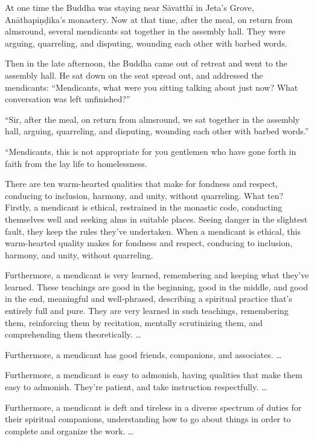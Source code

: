 \documentclass[12pt,openany]{book}%
\begin{document}
At one time the Buddha was staying near \textsanskrit{Sāvatthī} in Jeta’s Grove, \textsanskrit{Anāthapiṇḍika}’s monastery. Now at that time, after the meal, on return from almsround, several mendicants sat together in the assembly hall. They were arguing, quarreling, and disputing, wounding each other with barbed words. 

Then in the late afternoon, the Buddha came out of retreat and went to the assembly hall. He sat down on the seat spread out, and addressed the mendicants: “Mendicants, what were you sitting talking about just now? What conversation was left unfinished?” 

“Sir, after the meal, on return from almsround, we sat together in the assembly hall, arguing, quarreling, and disputing, wounding each other with barbed words.” 

“Mendicants, this is not appropriate for you gentlemen who have gone forth in faith from the lay life to homelessness. 

There are ten warm-hearted qualities that make for fondness and respect, conducing to inclusion, harmony, and unity, without quarreling. What ten? Firstly, a mendicant is ethical, restrained in the monastic code, conducting themselves well and seeking alms in suitable places. Seeing danger in the slightest fault, they keep the rules they’ve undertaken. When a mendicant is ethical, this warm-hearted quality makes for fondness and respect, conducing to inclusion, harmony, and unity, without quarreling. 

Furthermore, a mendicant is very learned, remembering and keeping what they’ve learned. These teachings are good in the beginning, good in the middle, and good in the end, meaningful and well-phrased, describing a spiritual practice that’s entirely full and pure. They are very learned in such teachings, remembering them, reinforcing them by recitation, mentally scrutinizing them, and comprehending them theoretically. … 

Furthermore, a mendicant has good friends, companions, and associates. … 

Furthermore, a mendicant is easy to admonish, having qualities that make them easy to admonish. They’re patient, and take instruction respectfully. … 

Furthermore, a mendicant is deft and tireless in a diverse spectrum of duties for their spiritual companions, understanding how to go about things in order to complete and organize the work. … 
\end{document}
